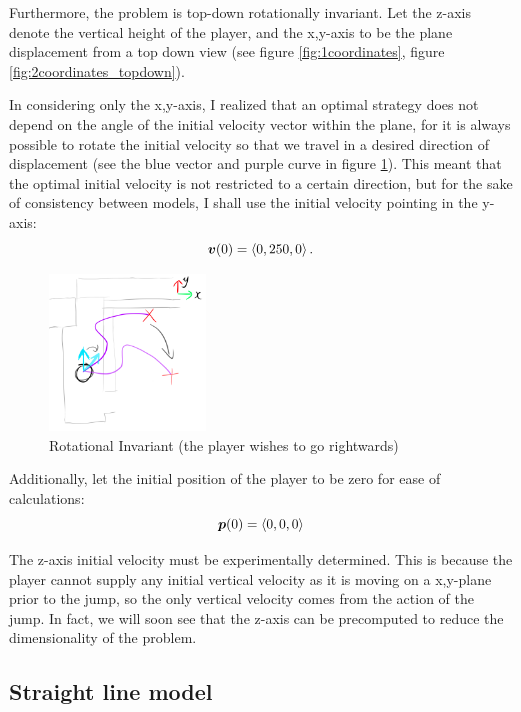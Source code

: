 Furthermore, the problem is top-down rotationally invariant. Let the z-axis denote the vertical height of the player, and the x,y-axis to be the plane displacement from a top down view (see figure \ref{fig:1coordinates}, figure \ref{fig:2coordinates_topdown}).

In considering only the x,y-axis, I realized that an optimal strategy does not depend on the angle of the initial velocity vector within the plane, for it is always possible to rotate the initial velocity so that we travel in a desired direction of displacement (see the blue vector and purple curve in figure \ref{fig:2turning}). This meant that the optimal initial velocity is not restricted to a certain direction, but for the sake of consistency between models, I shall use the initial velocity pointing in the y-axis:
\[
    \boldsymbol{v}(0) = \left\langle 0, 250, 0 \right\rangle.
\]

\begin{figure}
    \includegraphics[width=0.37\textwidth,right]{assets/2turning.png}
    \caption{Rotational Invariant (the player wishes to go rightwards)}
    \label{fig:2turning}
\end{figure}


Additionally, let the initial position of the player to be zero for ease of calculations:
\[
    \boldsymbol{p}(0) = \left\langle 0, 0, 0 \right\rangle
\]


The z-axis initial velocity must be experimentally determined. This is because the player cannot supply any initial vertical velocity as it is moving on a x,y-plane prior to the jump, so the only vertical velocity comes from the action of the jump. In fact, we will soon see that the z-axis can be precomputed to reduce the dimensionality of the problem.

\subsection{Straight line model}

